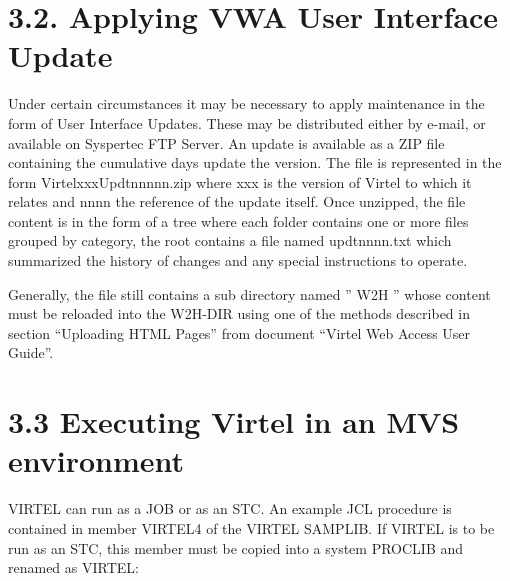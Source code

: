 \documentclass[letterpaper,10pt,english]{sphinxmanual}
\begin{document}
\section{3.2. Applying VWA User Interface Update}
\label{\detokenize{Installation_Guide:applying-vwa-user-interface-update}}
Under certain circumstances it may be necessary to apply maintenance in the form of User Interface Updates. These may be distributed either by e-mail, or available on Syspertec FTP Server.
An update is available as a ZIP file containing the cumulative days update the version. The file is represented in the form VirtelxxxUpdtnnnnn.zip where xxx is the version of Virtel to which it relates and nnnn the reference of the update itself. Once unzipped, the file content is in the form of a tree where each folder contains one or more files grouped by category, the root contains a file named updtnnnn.txt which summarized the history of changes and any special instructions to operate.

Generally, the file still contains a sub directory named ” W2H ” whose content must be reloaded into the W2H-DIR using one of the methods described in section “Uploading HTML Pages” from document “Virtel Web Access User Guide”.


\section{3.3 Executing Virtel in an MVS environment}
\label{\detokenize{Installation_Guide:executing-virtel-in-an-mvs-environment}}
VIRTEL can run as a JOB or as an STC. An example JCL procedure is contained in member VIRTEL4 of the VIRTEL SAMPLIB. If VIRTEL is to be run as an STC, this member must be copied into a system PROCLIB and renamed as VIRTEL:
\end{document}
